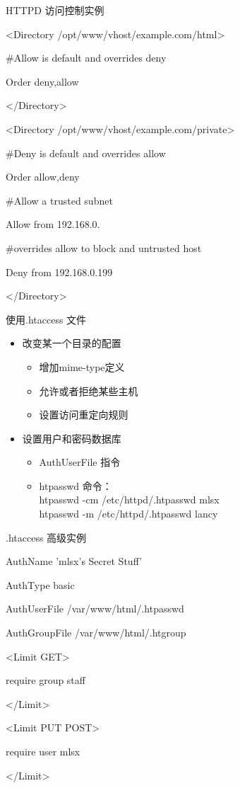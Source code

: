 \begin{frame}{HTTPD 访问控制实例}

<Directory /opt/www/vhost/example.com/html>

\#Allow is default and overrides deny

Order deny,allow

</Directory>

<Directory /opt/www/vhost/example.com/private>

\#Deny is default and overrides allow

Order allow,deny

\#Allow a trusted subnet

Allow from 192.168.0.

\#overrides allow to block and untrusted host

Deny from 192.168.0.199

</Directory>


\end{frame} 
\begin{frame}{使用.htaccess 文件}
\begin{itemize}
\item 改变某一个目录的配置

\begin{itemize}
\item 增加mime-type定义
\item 允许或者拒绝某些主机
\item 设置访问重定向规则
\end{itemize}
\item 设置用户和密码数据库

\begin{itemize}
\item AuthUserFile 指令
\item htpasswd 命令：\\
htpasswd -cm /etc/httpd/.htpasswd mlsx\\
htpasswd -m /etc/httpd/.htpasswd lancy
\end{itemize}
\end{itemize}

\end{frame} \begin{frame}{.htaccess 高级实例}

AuthName      'mlsx's Secret Stuff'

AuthType      basic

AuthUserFile  /var/www/html/.htpasswd

AuthGroupFile /var/www/html/.htgroup

<Limit GET>

require group staff

</Limit>

<Limit PUT POST>

require user mlsx

</Limit>


\end{frame} 
